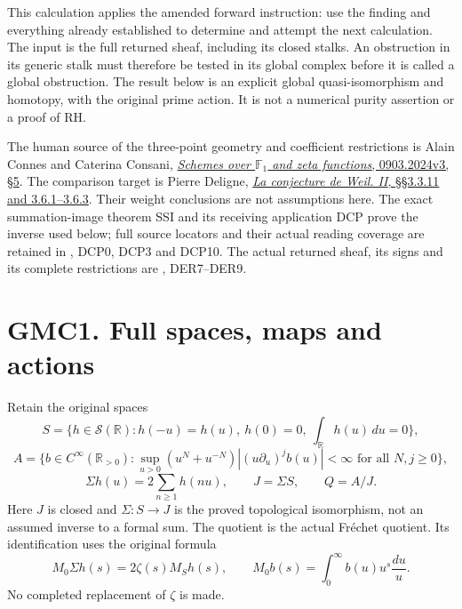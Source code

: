 This calculation applies the amended forward instruction: use the
finding and everything already established to determine and attempt the
next calculation. The input is the full returned sheaf, including its
closed stalks. An obstruction in its generic stalk must therefore be
tested in its global complex before it is called a global obstruction.
The result below is an explicit global quasi-isomorphism and homotopy,
with the original prime action. It is not a numerical purity assertion
or a proof of RH.

The human source of the three-point geometry and coefficient
restrictions is Alain Connes and Caterina Consani,
\href{https://arxiv.org/abs/0903.2024v3}{\emph{Schemes over
\(\mathbb F_1\) and zeta functions}, 0903.2024v3, §5}. The comparison
target is Pierre Deligne,
\href{https://www.numdam.org/item/PMIHES_1980__52__137_0/}{\emph{La
conjecture de Weil. II}, §§3.3.11 and 3.6.1--3.6.3}. Their weight
conclusions are not assumptions here. The exact summation-image theorem
SSI and its receiving application DCP prove the inverse used below; full
source locators and their actual reading coverage are retained in
\href{https://github.com/KokunoYumeto/zeta-function-research-reader/blob/36a82ecca98addb8a98b48204e349737856c7223/workbenches/splitzero-tandem/continuations/20260924-cohomology-weight-and-character-lifts/original-character-lifting/tau_lifting_weights_20260924/SOURCE_CC_DOUBLE_PULLBACK.md}{},
DCP0, DCP3 and DCP10. The actual returned sheaf, its signs and its
complete restrictions are
\href{https://github.com/KokunoYumeto/zeta-function-research-reader/blob/main/workbenches/splitzero-tandem/continuations/20260925-full-source-tensor-and-original-divisor/counterfactual/DIAGONAL_EXTRAORDINARY_RETURN.md}{},
DER7--DER9.

\section{GMC1. Full spaces, maps and
actions}\label{gmc1.-full-spaces-maps-and-actions}

Retain the original spaces \[
S=\{h\in\mathcal S(\mathbb R):h(-u)=h(u),\ h(0)=0,\ \int_{\mathbb R}h(u)\,du=0\},
\] \[
A=\{b\in C^\infty(\mathbb R_{>0}):
\sup_{u>0}(u^N+u^{-N})|(u\partial_u)^j b(u)|<\infty
\text{ for all }N,j\geq0\},
\] \[
\Sigma h(u)=2\sum_{n\geq1}h(nu),\qquad
J=\Sigma S,\qquad Q=A/J.
\tag{GMC1.1}
\] Here \(J\) is closed and \(\Sigma:S\to J\) is the proved topological
isomorphism, not an assumed inverse to a formal sum. The quotient is the
actual Fréchet quotient. Its identification uses the original formula \[
M_0\Sigma h(s)=2\zeta(s)M_Sh(s),\qquad
M_0b(s)=\int_0^\infty b(u)u^s\frac{du}{u}.
\tag{GMC1.2}
\] No completed replacement of \(\zeta\) is made.

